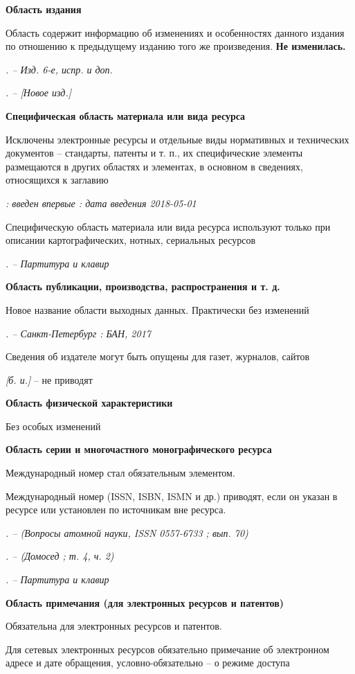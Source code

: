 \textbf{Область издания}

Область содержит информацию об изменениях и особенностях данного издания по отношению к предыдущему изданию того же произведения. \textbf{Не изменилась.}

\textsl{. -- Изд. 6-е, испр. и доп.}

\textsl{. -- {[}Новое изд.{]}}

\textbf{Специфическая область материала или вида ресурса}

Исключены электронные ресурсы и отдельные виды нормативных и технических документов -- стандарты, патенты и т. п., их специфические элементы размещаются в других областях и элементах, в основном в сведениях, относящихся к заглавию

\textsl{: введен впервые : дата введения 2018-05-01}

Специфическую область материала или вида ресурса используют только при описании картографических, нотных, сериальных ресурсов

\textsl{. -- Партитура и клавир}

\textbf{Область публикации, производства, распространения и т. д.}

Новое название области выходных данных. Практически без изменений

\textsl{. -- Санкт-Петербург : БАН, 2017}

Сведения об издателе могут быть опущены для газет, журналов, сайтов

\textsl{{[}б. и.{]}} -- не приводят

\textbf{Область физической характеристики}

Без особых изменений

\textbf{Область серии и многочастного монографического ресурса}

Международный номер стал обязательным элементом.

Международный номер (ISSN, ISBN, ISMN и др.) приводят, если он указан в ресурсе или установлен по источникам вне ресурса.

\textsl{. -- (Вопросы атомной науки, ISSN 0557-6733 ; вып. 70)}

\textsl{. -- (Домосед ; т. 4, ч. 2)}

\textsl{. -- Партитура и клавир}

\textbf{Область примечания (для электронных ресурсов и патентов)}

Обязательна для электронных ресурсов и патентов.

Для сетевых электронных ресурсов обязательно примечание об электронном адресе и дате обращения, условно-обязательно -- о режиме доступа

